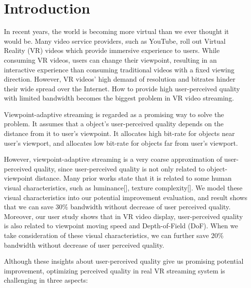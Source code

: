 \section{Introduction}

In recent years, the world is becoming more virtual than we ever thought it would be. Many video service providers, such as YouTube, roll out Virtual Reality (VR) videos which provide immersive experience to users. While consuming VR videos, users can change their viewpoint, resulting in an interactive experience than consuming traditional videos with a fixed viewing direction. However, VR videos' high demand of resolution and bitrates hinder their wide spread over the Internet. How to provide high user-perceived quality with limited bandwidth becomes the biggest problem in VR video streaming.

Viewpoint-adaptive streaming is regarded as a promising way to solve the problem. It assumes that a object's user-perceived quality depends on the distance from it to user's viewpoint. It allocates high bit-rate for objects near user's viewport, and allocates low bit-rate for objects far from user's viewport. 

However, viewpoint-adaptive streaming is a very coarse approximation of user-perceived quality, since user-perceived quality is not only related to object-viewpoint distance. Many prior works state that it is related to some human visual characteristics, such as luminance[], texture complexity[]. We model these visual characteristics into our potential improvement evaluation, and result shows that we can save 30\% bandwidth without decrease of user perceived quality. Moreover, our user study shows that in VR video display, user-perceived quality is also related to viewpoint moving speed and Depth-of-Field (DoF). When we take consideration of these visual characteristics, we can further save 20\% bandwidth without decrease of user perceived quality.

Although these insights about user-perceived quality give us promising potential improvement, optimizing perceived quality in real VR streaming system is challenging in three aspects:

